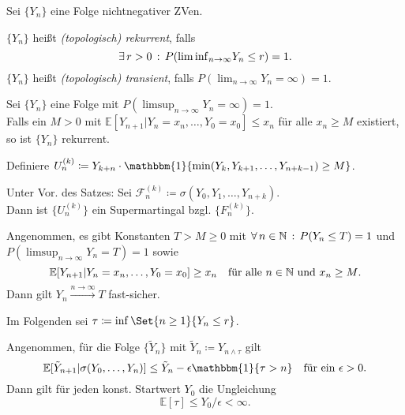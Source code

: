 \documentclass{cheat-sheet}
\newcommand{\E}{\mathbb{E}} %
\newcommand{\ind}{\mathbbm{1}} %
\newcommand{\Filt}{\mathcal{F}} %
\begin{document}

Sei $\{ Y_n \}$ eine Folge nichtnegativer ZVen.

\begin{defn}
  $\{ Y_n \}$ heißt \emph{(topologisch) rekurrent}, falls
  \[ \exists \, {r > 0} \,:\, P({\liminf}_{n \to \infty} Y_n \leq r) = 1. \]
  $\{ Y_n \}$ heißt \emph{(topologisch) transient}, falls $P({\lim}_{n \to \infty} Y_n = \infty) = 1$.
\end{defn}

\begin{satz}
  Sei $\{ Y_n \}$ eine Folge mit $P({\limsup}_{n \to \infty} Y_n = \infty) = 1$. \\
  Falls ein $M > 0$ mit $\E[ Y_{n+1} | Y_n = x_n, \ldots, Y_0 = x_0 ] \leq x_n$ für alle $x_n \geq M$ existiert, so ist $\{ Y_n \}$ rekurrent.
\end{satz}

Definiere $U_n^{(k)} \coloneqq Y_{k+n} \cdot \ind \{ \min(Y_k, Y_{k+1}, \ldots, Y_{n+k-1}) \geq M \}$.

\begin{lem}
  \begin{minipage}[t]{0.8 \linewidth}
    Unter Vor. des Satzes:
    Sei $\Filt_n^{(k)} \coloneqq \sigma(Y_0, Y_1, \ldots, Y_{n+k})$. \\
    Dann ist $\{ U_n^{(k)} \}$ ein Supermartingal bzgl. $\{ F_n^{(k)} \}$.
  \end{minipage}
\end{lem}

\begin{satz}
  Angenommen, es gibt Konstanten $T > M \geq 0$ mit $\forall \, {n \in \mathbb{N}} \,:\, P(Y_n \leq T) = 1$ und $P({\limsup}_{n \to \infty} Y_n = T) = 1$ sowie
  \[
    \E[ Y_{n+1} | Y_n = x_n, \ldots, Y_0 = x_0 ] \geq x_n
    \quad \text{für alle $n \in \N$ und $x_n \geq M$.}
  \]
  Dann gilt $Y_n \xrightarrow{n \to \infty} T$ fast-sicher.
\end{satz}

Im Folgenden sei $\tau \coloneqq \inf \Set{n \geq 1}{Y_n \leq r}$.

\begin{satz}
  Angenommen, für die Folge $\{ \tilde{Y}_n \}$ mit $\tilde{Y}_n \coloneqq Y_{n \wedge \tau}$ gilt
  \[
    \E[ \tilde{Y}_{n+1} | \sigma(Y_0, \ldots, Y_n) ] \leq \tilde{Y}_n - \epsilon \ind \{ \tau > n \}
    \quad \text{für ein $\epsilon > 0$}.
  \]
  Dann gilt für jeden konst. Startwert $Y_0$ die Ungleichung
  \[ \E[\tau] \leq Y_0 / \epsilon < \infty. \]
\end{satz}
\end{document}
